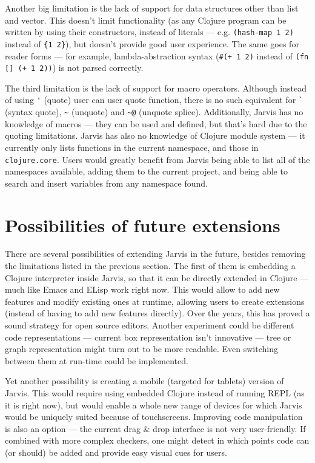 \documentclass[english,mgr,shortabstract]{iithesis}
\begin{document}
Another big limitation is the lack of support for data structures other than
list and vector.
This doesn’t limit functionality (as any Clojure program can be written by using
their constructors, instead of literals --- e.g. \lstinline|(hash-map 1 2)|
instead of \lstinline|{1 2}|),
but doesn’t provide good user experience.
The same goes for reader forms --- for example, lambda-abstraction syntax
(\lstinline|#(+ 1 2)|
instead of \lstinline|(fn [] (+ 1 2))|) is not parsed correctly.

The third limitation is the lack of support for macro operators.
Although instead of using \lstinline|'| (quote) user can user quote function, there is no
such equivalent for \lstinline|`| (syntax quote), \lstinline|~| (unquote) and
\lstinline|~@| (unquote splice).
Additionally, Jarvis has no knowledge of macros --- they can be used and defined,
but that’s hard due to the quoting limitations.
Jarvis has also no knowledge of Clojure module system --- it currently only lists
functions in the current namespace, and those in \lstinline|clojure.core|.
Users would greatly benefit from Jarvis being able to list all of the namespaces
available, adding them to the current project, and being able to search and
insert variables from any namespace found.


\section{Possibilities of future extensions}
There are several possibilities of extending Jarvis in the future, besides
removing the limitations listed in the previous section.
The first of them is embedding a Clojure interpreter inside Jarvis, so that it
can be directly extended in Clojure --- much like Emacs and ELisp work right now.
This would allow to add new features and modify existing ones at runtime,
allowing users to create extensions (instead of having to add new features
directly).
Over the years, this has proved a sound strategy for open source editors.
Another experiment could be different code representations --- current box
representation isn’t innovative --- tree or graph representation might turn out to
be more readable.
Even switching between them at run-time could be implemented.

Yet another possibility is creating a mobile (targeted for tablets) version of
Jarvis.
This would require using embedded Clojure instead of running REPL (as it is
right now), but would enable a whole new range of devices for which Jarvis would
be uniquely suited because of touchscreens.
Improving code manipulation is also an option --- the current drag \& drop
interface is not very user-friendly.
If combined with more complex checkers, one might detect in which points code
can (or should) be added and provide easy visual cues for users.
\end{document}
